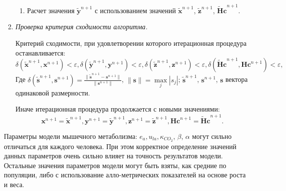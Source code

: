 \begin{enumerate}
\begin{enumerate}
	\item Расчет значения $\tilde{\mathbf{y}}^{n+1}$ с использованием значений $\tilde{\mathbf{x}}^{n+1}$, $\tilde{\mathbf{z}}^{n+1}$, $\mathbf{\widetilde{H}c}^{n+1}$.

\end{enumerate}

	\item {\it Проверка критерия сходимости алгоритма.}
	
	 Критерий сходимости, при удовлетворении которого итерационная процедура останавливается:
	\begin{equation*}
	\delta \left( \tilde{\mathbf{x}}^{n+1}, \mathbf{x}^{n+1} \right) < \varepsilon, \delta \left( \tilde{\mathbf{y}}^{n+1}, \mathbf{y}^{n+1} \right) < \varepsilon, \delta \left( \tilde{\mathbf{z}}^{n+1}, \mathbf{z}^{n+1} \right) < \varepsilon, \delta \left( \mathbf{\tilde{H}c}^{n+1}, \mathbf{Hc}^{n+1} \right) < \varepsilon,
	\end{equation*}
	Где $\delta \left( \tilde{\mathbf{s}}^{n+1}, \mathbf{s}^{n+1} \right) = \displaystyle \frac{\|\tilde{\mathbf{s}}^{n+1} - \mathbf{s}^{n+1}\|}{\|\mathbf{s}^{n+1}\|}$, $\|\mathbf{s}\| = \max \limits_j \left| s_j \right|$; $\tilde{\mathbf{s}}^{n+1}$, $\mathbf{s}^{n+1}$, $\mathbf{s}$ вектора одинаковой размерности. 
	
	Иначе итерационная процедура продолжается с новыми значениями:
	\begin{equation*}
	{\mathbf{x}}^{n+1} = \tilde{\mathbf{x}}^{n+1}, \mathbf{y}^{n+1} = \tilde{\mathbf{y}}^{n+1}, \mathbf{z}^{n+1} = \tilde{\mathbf{z}}^{n+1}, \mathbf{Hc}^{n+1} = \mathbf{\tilde{H}c}^{n+1}.
	\end{equation*}

\end{enumerate}

Параметры модели мышечного метаболизма: \(e_{a}, u_{la}, \kappa_{CO_{2}}\), $\beta$, $\alpha$ могут сильно отличаться для каждого человека. При этом корректное определение значений данных параметров очень сильно влияет на точность результатов модели. Остальные значения параметров модели могут быть взяты, как средние по популяции, либо с использование алло-метрических показателей на основе роста и веса.  

